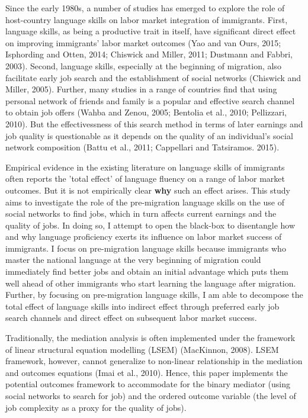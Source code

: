 \documentclass[12pt,a4paper]{article}
\begin{document}
Since the early 1980s, a number of studies has emerged to explore the role of host-country language skills on labor market integration of immigrants. First, language skills, as being a productive trait in itself, have significant direct effect on improving immigrants' labor market outcomes (Yao and van Ours, 2015; Isphording and Otten, 2014; Chiswick and Miller, 2011; Dustmann and Fabbri, 2003). Second, language skills, especially at the beginning of migration, also facilitate early job search and the establishment of social networks (Chiswick and Miller, 2005). Further, many studies in a range of countries find that using personal network of friends and family is a popular and effective search channel to obtain job offers (Wahba and Zenou, 2005; Bentolia et al., 2010; Pellizzari, 2010). But the effectivessness of this search method in terms of later earnings and job quality is questionable as it depends on the quality of an individual's social network composition (Battu et al., 2011; Cappellari and Tatsiramos. 2015).

Empirical evidence in the existing literature on language skills of immigrants often reports the 'total effect' of language fluency on a range of labor market outcomes. But it is not empirically clear \textbf{why} such an effect arises. This study aims to investigate the role of the pre-migration language skills on the use of social networks to find jobs, which in turn affects current earnings and the quality of jobs. In doing so, I attempt to open the black-box to disentangle how and why language proficiency exerts its influence on labor market success of immigrants. I focus on pre-migration language skills because immigrants who master the national language at the very beginning of migration could immediately find better jobs and obtain an initial advantage which puts them well ahead of other immigrants who start learning the language after migration. Further, by focusing on pre-migration language skills, I am able to decompose the total effect of language skills into indirect effect through preferred early job search channels and direct effect on subsequent labor market success.

Traditionally, the mediation analysis is often implemented under the framework of linear structural equation modelling (LSEM) (MacKinnon, 2008). LSEM framework, however, cannot generalize to non-linear relationship in the mediation and outcomes equations (Imai et al., 2010). Hence, this paper implements the potential outcomes framework to accommodate for the binary mediator (using social networks to search for job) and the ordered outcome variable (the level of job complexity as a proxy for the quality of jobs).
\end{document}
